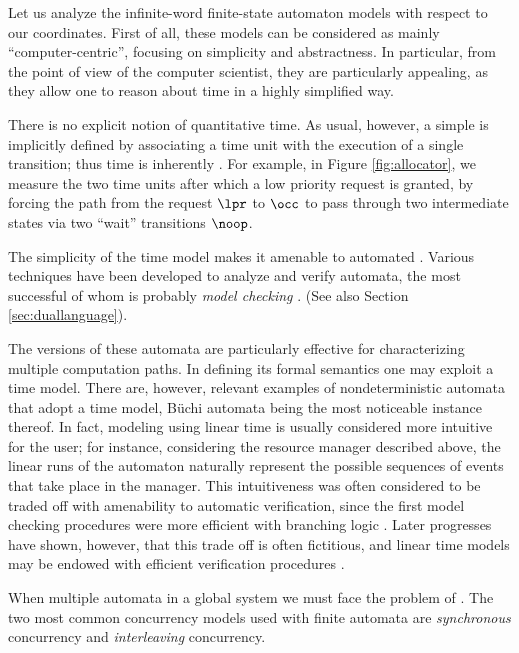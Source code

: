 Let us analyze the infinite-word finite-state automaton models 
with respect to our coordinates. First of all, these models can 
be considered as mainly ``computer-centric'', focusing on simplicity 
and abstractness. In particular, from the point of view of the 
computer scientist, they are particularly appealing, as they 
allow one to reason about time in a highly simplified way.

There is no explicit notion of quantitative time. As usual, however, 
a simple  is implicitly defined by associating a time unit 
with the execution of a single transition; thus time is inherently . 
For example, in Figure \ref{fig:allocator}, we measure  the two time units after 
which a low priority request is granted, by forcing the path 
from the request $\lpr$ to $\occ$ to pass through two intermediate 
states via two ``wait'' transitions $\noop$.

The simplicity of the time model makes it amenable to automated 
. Various techniques have been developed to analyze 
and verify automata, the most successful of whom is probably \emph{model checking} \cite{CGP00}.
(See also Section \ref{sec:duallanguage}).

The  versions of these automata are particularly 
effective for characterizing multiple computation paths. In defining 
its formal semantics one may exploit a  time model. 
There are, however, relevant examples of nondeterministic automata 
that adopt a  time model, B\"uchi automata being the most 
noticeable instance thereof. In fact, modeling using linear time 
is usually considered more intuitive for the user; for instance, 
considering the resource manager described above, the linear 
runs of the automaton naturally represent the possible sequences 
of events that take place in the manager. This intuitiveness 
was often considered to be traded off with amenability to automatic 
verification, since the first model checking procedures were 
more efficient with branching logic \cite{CGP00}. Later progresses 
have shown, however, that this trade off is often fictitious, 
and linear time models may be endowed with efficient verification 
procedures \cite{Var01}.

When  multiple automata in a global system we must face 
the problem of . The two most common concurrency models 
used with finite automata are \emph{synchronous} concurrency and \emph{interleaving} 
concurrency. 

